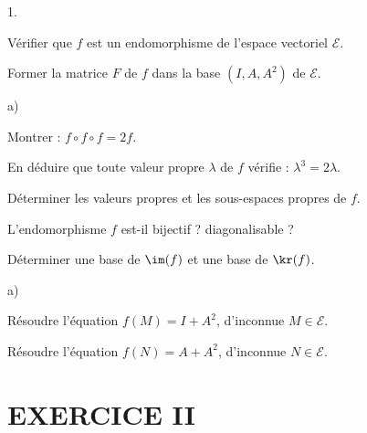 \begin{noliste}{1.}
\setlength{\itemsep}{4mm}
\setcounter{enumi}{6}
\item Vérifier que $f$ est un endomorphisme de l'espace vectoriel 
$\mathcal{E}$.



\item Former la matrice $F$ de $f$ dans la base $(I,A,A^2)$ de 
$\mathcal{E}$.



\item
\begin{noliste}{a)}
\setlength{\itemsep}{2mm}
\item Montrer : $f\circ f\circ f=2f$.




\item En déduire que toute valeur propre $\lambda$ de $f$ vérifie : 
$\lambda^3=2\lambda$.



\item Déterminer les valeurs propres et les sous-espaces propres de $f$.


\end{noliste}

\item L'endomorphisme $f$ est-il bijectif ? diagonalisable ?



\item Déterminer une base de $\im(f)$ et une base de 
$\kr(f)$.



\item 
\begin{noliste}{a)}
\setlength{\itemsep}{2mm}
\item Résoudre l'équation $f(M)=I+A^2$, d'inconnue $M\in \mathcal{E}$.






\item Résoudre l'équation $f(N)=A+A^2$, d'inconnue $N\in \mathcal{E}$.



\end{noliste}
\end{noliste}


\newpage


\section*{EXERCICE II}

